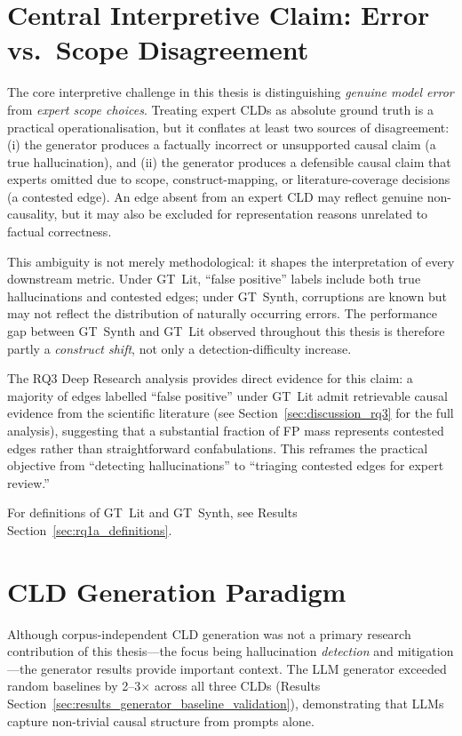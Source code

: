 \section{Central Interpretive Claim: Error vs.\ Scope Disagreement}
\label{sec:discussion_framing}
The core interpretive challenge in this thesis is distinguishing \emph{genuine model error} from \emph{expert scope choices}. Treating expert CLDs as absolute ground truth is a practical operationalisation, but it conflates at least two sources of disagreement: (i) the generator produces a factually incorrect or unsupported causal claim (a true hallucination), and (ii) the generator produces a defensible causal claim that experts omitted due to scope, construct-mapping, or literature-coverage decisions (a contested edge). An edge absent from an expert CLD may reflect genuine non-causality, but it may also be excluded for representation reasons unrelated to factual correctness.

This ambiguity is not merely methodological: it shapes the interpretation of every downstream metric. Under GT~Lit, ``false positive'' labels include both true hallucinations and contested edges; under GT~Synth, corruptions are known but may not reflect the distribution of naturally occurring errors. The performance gap between GT~Synth and GT~Lit observed throughout this thesis is therefore partly a \emph{construct shift}, not only a detection-difficulty increase.

The RQ3 Deep Research analysis provides direct evidence for this claim: a majority of edges labelled ``false positive'' under GT~Lit admit retrievable causal evidence from the scientific literature (see Section~\ref{sec:discussion_rq3} for the full analysis), suggesting that a substantial fraction of FP mass represents contested edges rather than straightforward confabulations. This reframes the practical objective from ``detecting hallucinations'' to ``triaging contested edges for expert review.''

For definitions of GT~Lit and GT~Synth, see Results Section~\ref{sec:rq1a_definitions}.

\section{CLD Generation Paradigm}
\label{sec:discussion_generation_paradigm}
Although corpus-independent CLD generation was not a primary research contribution of this thesis---the focus being hallucination \emph{detection} and mitigation---the generator results provide important context. The LLM generator exceeded random baselines by 2--3$\times$ across all three CLDs (Results Section~\ref{sec:results_generator_baseline_validation}), demonstrating that LLMs capture non-trivial causal structure from prompts alone.

